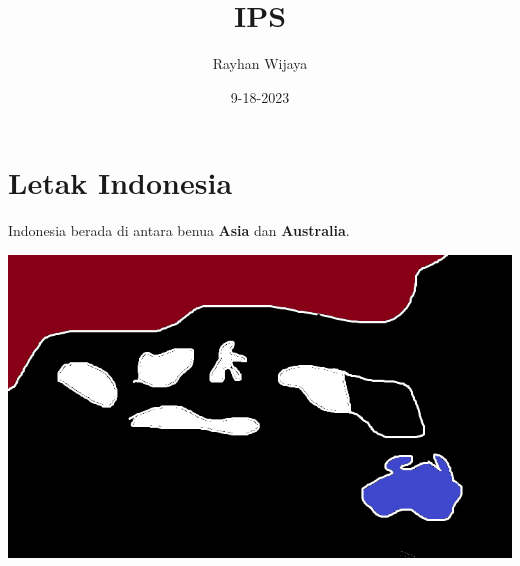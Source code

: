 \documentclass[12pt]{report}
\title{IPS}
\author{Rayhan Wijaya}
\date{9-18-2023}
\begin{document}
\maketitle

\section*{Letak Indonesia}

Indonesia berada di antara benua \textbf{Asia} dan \textbf{Australia}.

\includegraphics[scale=0.8]{indonesia-asia-australia}
\end{document}
